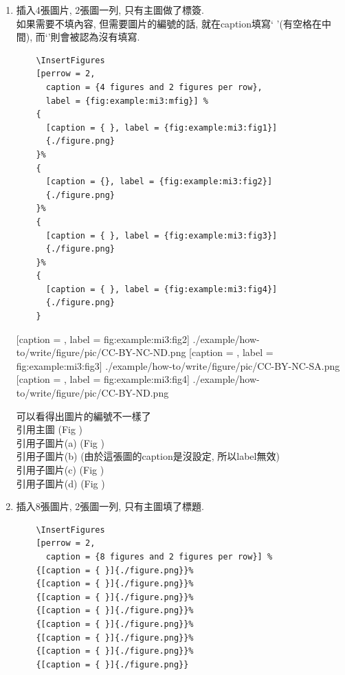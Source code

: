 \begin{enumerate}
{    e.g: 
    引用主圖 (Fig ) ,
    引用子圖片 (Fig , Fig ).
  } %

  \newpage
  \item
  {
    插入4張圖片, 2張圖一列, 只有主圖做了標簽.\\
    如果需要不填內容, 但需要圖片的編號的話, 就在caption填寫`{ }'(有空格在中間), 而`{}'則會被認為沒有填寫.
    \begin{verbatim}
    \InsertFigures
    [perrow = 2,
      caption = {4 figures and 2 figures per row},
      label = {fig:example:mi3:mfig}] %
    {
      [caption = { }, label = {fig:example:mi3:fig1}]
      {./figure.png}
    }%
    {
      [caption = {}, label = {fig:example:mi3:fig2}]
      {./figure.png}
    }%
    {
      [caption = { }, label = {fig:example:mi3:fig3}]
      {./figure.png}
    }%
    {
      [caption = { }, label = {fig:example:mi3:fig4}]
      {./figure.png}
    }
    \end{verbatim}

    {
      [caption = {},
      label = {fig:example:mi3:fig2}]      
      {./example/how-to/write/figure/pic/CC-BY-NC-ND.png}
    }%
    {
      [caption = { },
      label = {fig:example:mi3:fig3}]      
      {./example/how-to/write/figure/pic/CC-BY-NC-SA.png}
    }%
    {
      [caption = { },
      label = {fig:example:mi3:fig4}]      
      {./example/how-to/write/figure/pic/CC-BY-ND.png}
    }

    可以看得出圖片的編號不一樣了\\
    引用主圖 (Fig )\\
    引用子圖片(a) (Fig )\\
    引用子圖片(b) (由於這張圖的caption是沒設定, 所以label無效)\\
    引用子圖片(c) (Fig )\\
    引用子圖片(d) (Fig )
  } %

  \newpage
  \item
  {
    插入8張圖片, 2張圖一列, 只有主圖填了標題.\\
    \begin{verbatim}
    \InsertFigures
    [perrow = 2,
      caption = {8 figures and 2 figures per row}] %
    {[caption = { }]{./figure.png}}%
    {[caption = { }]{./figure.png}}%
    {[caption = { }]{./figure.png}}%
    {[caption = { }]{./figure.png}}%
    {[caption = { }]{./figure.png}}%
    {[caption = { }]{./figure.png}}%
    {[caption = { }]{./figure.png}}%
    {[caption = { }]{./figure.png}}
    \end{verbatim}

}
\end{enumerate}
